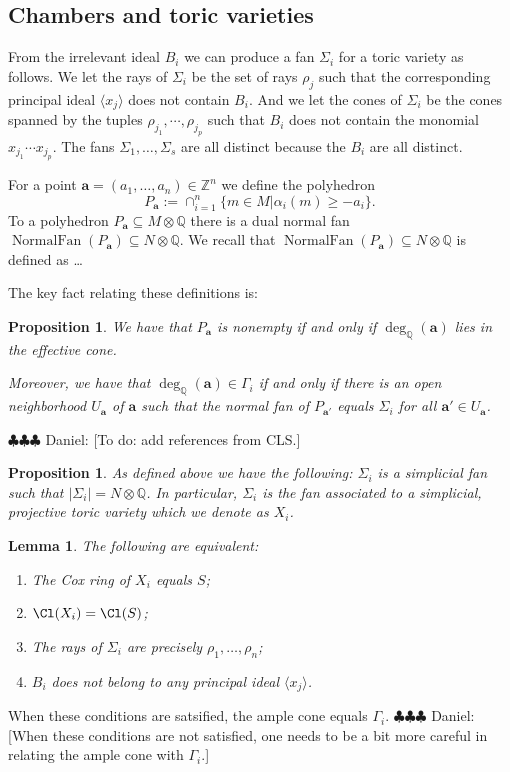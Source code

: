 \documentclass[11pt]{amsart}
\numberwithin{equation}{section}
\newtheorem{lemma}[equation]{Lemma}
\newtheorem{prop}[equation]{Proposition}
\theoremstyle{definition}
\theoremstyle{remark}
\newcommand{\ZZ}{\mathbb Z}
\newcommand{\QQ}{\mathbb Q}
\newcommand{\daniel}[1]{{\color{blue} \sf $\clubsuit\clubsuit\clubsuit$ Daniel: [#1]}}
\begin{document}
\subsection{Chambers and toric varieties}
From the irrelevant ideal $B_i$ we can produce a fan $\Sigma_i$ for a toric variety as follows.  We let the rays of $\Sigma_i$ be the set of rays $\rho_j$ such that the corresponding principal ideal $\langle x_j\rangle$ does not contain $B_i$.  And we let the cones of $\Sigma_i$ be the cones spanned by the tuples $\rho_{j_1}, \cdots, \rho_{j_p}$ such that $B_i$ does not contain the monomial $x_{j_1}\cdots x_{j_p}$.    The fans $\Sigma_1, \dots, \Sigma_s$ are all distinct because the $B_i$ are all distinct.

For a point $\mathbf{a}=(a_1, \dots, a_n)\in \ZZ^{n}$ we define the polyhedron
\[
P_{\mathbf{a}} := \cap_{i=1}^n \{ m \in M | \alpha_i(m) \geq -a_i\}.
\]
To a polyhedron $P_{\mathbf{a}}\subseteq M\otimes \QQ$ there is a dual normal fan $\operatorname{NormalFan}(P_{\mathbf{a}})\subseteq N\otimes \QQ$.  We recall that $\operatorname{NormalFan}(P_{\mathbf{a}})\subseteq N\otimes \QQ$ is defined as \dots

The key fact relating these definitions is:
\begin{prop}\label{prop:polytopeAndFan}
We have that $P_{\mathbf{a}}$ is nonempty if and only if $\deg_{\QQ}(\mathbf{a})$ lies in the effective cone.  

Moreover, we have that $\deg_{\QQ}(\mathbf{a}) \in \Gamma_i$ if and only if there is an open neighborhood $U_{\mathbf{a}}$ of $\mathbf{a}$ such that the normal fan of $P_{\mathbf{a'}}$ equals $\Sigma_i$ for all $\mathbf{a}'\in U_{\mathbf{a}}$.
\end{prop}
\daniel{To do:  add references from CLS.}



\begin{prop}\label{defn:fanAndXi}
    As defined above we have the following: $\Sigma_i$ is a simplicial fan such that $|\Sigma_i|=N\otimes \QQ$.  In particular,  $\Sigma_i$ is the fan associated to a simplicial, projective toric variety which we denote as $X_i$.
\end{prop}


\begin{lemma}
The following are equivalent:
\begin{enumerate}
    \item The Cox ring of $X_i$ equals $S$;
    \item $\Cl(X_i)=\Cl(S)$;
    \item  The rays of $\Sigma_i$ are precisely $\rho_1, \dots, \rho_n$;
    \item  $B_i$ does not belong to any principal ideal $\langle x_j\rangle$.
\end{enumerate}
\end{lemma}
When these conditions are satsified, the ample cone equals $\Gamma_i$.  \daniel{When these conditions are not satisfied, one needs to be a bit more careful in relating the ample cone with $\Gamma_i$.}
\end{document}
